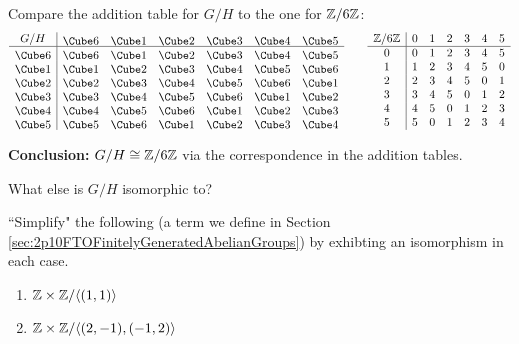 \documentclass[../algebraNotesMSRI-UP2016.tex]{subfiles}
\begin{document}
\begin{frame}
Compare the addition table for $G/H$ to the one for $\mathbb Z/6\mathbb Z$:
\[
\begin{array}{c | c c c c c c }
 G/H  & \die{6} & \die{1} & \die{2} & \die{3} & \die{4} & \die{5} \\
 \hline
 \die{6} & \die{6} & \die{1} & \die{2} & \die{3} & \die{4} & \die{5} \\ 
 \die{1} & \die{1} & \die{2} & \die{3} & \die{4} & \die{5} & \die{6} \\
 \die{2} & \die{2} & \die{3} & \die{4} & \die{5} & \die{6} & \die{1} \\
 \die{3} & \die{3} & \die{4} & \die{5} & \die{6} & \die{1} & \die{2} \\
 \die{4} & \die{4} & \die{5} & \die{6} & \die{1} & \die{2} & \die{3} \\
 \die{5} & \die{5} & \die{6} & \die{1} & \die{2} & \die{3} & \die{4}
\end{array}
\qquad
\begin{array}{c | c c c c c c }
 \Z/6\Z  & 0 & 1 & 2 & 3 & 4 & 5 \\
 \hline
 0 & 0 & 1 & 2 & 3 & 4 & 5 \\ 
 1 & 1 & 2 & 3 & 4 & 5 & 0 \\
 2 & 2 & 3 & 4 & 5 & 0 & 1 \\
 3 & 3 & 4 & 5 & 0 & 1 & 2 \\
 4 & 4 & 5 & 0 & 1 & 2 & 3 \\
 5 & 5 & 0 & 1 & 2 & 3 & 4
\end{array}
\]	

\smallGap
\textbf{Conclusion:} $G/H\cong \mathbb Z/6\mathbb Z$ via the correspondence in the addition tables.

\smallGap
\begin{que}
What else is $G/H$ isomorphic to?
\end{que}
\end{frame}


\begin{frame}[c]
\begin{exe}[cf. Problem 72]\label{exe:prob72}
``Simplify" the following  (a term we define in Section \ref{sec:2p10FTOFinitelyGeneratedAbelianGroups}) by exhibting an isomorphism in each case.
\begin{enumerate}
\item $\mathbb Z\times \mathbb Z/\langle(1,1)\rangle$
\item\label{exept:prob72-2} $\mathbb Z\times \mathbb Z/\langle(2,-1),(-1,2)\rangle$
\end{enumerate} 
\end{exe}
\end{frame}
\end{document}
